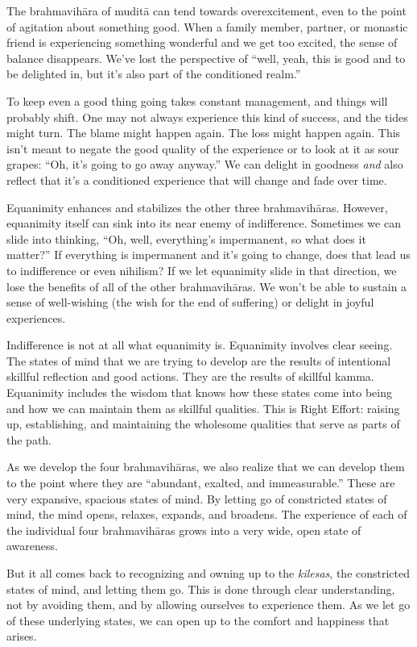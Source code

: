 The brahmavihāra of muditā can tend towards overexcitement, even to the point of agitation about something good. When a family member, partner, or monastic friend is experiencing something wonderful and we get too excited, the sense of balance disappears. We've lost the perspective of ``well, yeah, this is good and to be delighted in, but it's also part of the conditioned realm.''

To keep even a good thing going takes constant management, and things will probably shift. One may not always experience this kind of success, and the tides might turn. The blame might happen again. The loss might happen again. This isn't meant to negate the good quality of the experience or to look at it as sour grapes: ``Oh, it's going to go away anyway.'' We can delight in goodness \emph{and} also reflect that it's a conditioned experience that will change and fade over time.

Equanimity enhances and stabilizes the other three brahmavihāras. However, equanimity itself can sink into its near enemy of indifference. Sometimes we can slide into thinking, ``Oh, well, everything's impermanent, so what does it matter?'' If everything is impermanent and it's going to change, does that lead us to indifference or even nihilism? If we let equanimity slide in that direction, we lose the benefits of all of the other brahmavihāras. We won't be able to sustain a sense of well-wishing (the wish for the end of suffering) or delight in joyful experiences.

Indifference is not at all what equanimity is. Equanimity involves clear seeing. The states of mind that we are trying to develop are the results of intentional skillful reflection and good actions. They are the results of skillful kamma. Equanimity includes the wisdom that knows how these states come into being and how we can maintain them as skillful qualities. This is Right Effort: raising up, establishing, and maintaining the wholesome qualities that serve as parts of the path.

As we develop the four brahmavihāras, we also realize that we can develop them to the point where they are ``abundant, exalted, and immeasurable.'' These are very expansive, spacious states of mind. By letting go of constricted states of mind, the mind opens, relaxes, expands, and broadens. The experience of each of the individual four brahmavihāras grows into a very wide, open state of awareness.

But it all comes back to recognizing and owning up to the \emph{kilesas}, the constricted states of mind, and letting them go. This is done through clear understanding, not by avoiding them, and by allowing ourselves to experience them. As we let go of these underlying states, we can open up to the comfort and happiness that arises.

